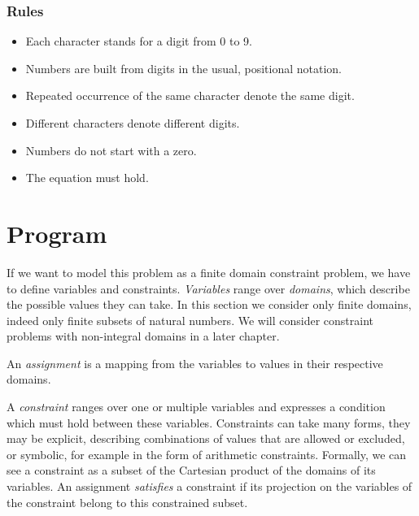 \begin{frame}
\frametitle{Rules}
\begin{itemize}
\item Each character stands for a digit from 0 to 9.
\item Numbers are built from digits in the usual, positional notation. 
\item Repeated occurrence of the same character denote the same digit.
\item Different characters denote different digits.
\item Numbers do not start with a zero.
\item The equation must hold.
\end{itemize}
\end{frame}


\section{Program}

If we want to model this problem as a finite domain constraint problem, we have to define variables and constraints. {\em Variables} range over {\em domains}, which describe the possible values they can take. In this section we consider only finite domains, indeed only finite subsets of natural numbers. We will consider constraint problems with non-integral domains in a later chapter. 

An {\em assignment} is a mapping from the variables to values in their respective domains.

A {\em constraint} ranges over one or multiple variables and expresses a condition which must hold between these variables. Constraints can take many forms, they may be explicit, describing combinations of values that are allowed or excluded, or symbolic, for example in the form of arithmetic constraints. Formally, we can see a constraint as a subset of the Cartesian product of the domains of its variables. An assignment {\em satisfies} a constraint if its projection on the variables of the constraint belong to this constrained subset.

